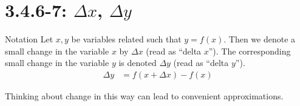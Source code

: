 \section{3.4.6-7: $\Delta x$, $\Delta y$}

\begin{frame}[t]\hfill\hyperlink{end3.4.7}{}
\begin{block}{Notation }
 Let $x,y$ be variables related such that $y = f(x)$. Then we denote a
  small change in the variable $x$ by $\Delta x$ (read as ``delta $x$''). The corresponding
small change in the variable $y$ is denoted $\Delta y$ (read as ``delta $y$'').
\begin{align*}
  \Delta y &= f(x+\Delta x) - f(x)
\end{align*}
\end{block}
Thinking about change in this way can lead to convenient approximations.
\end{frame}
